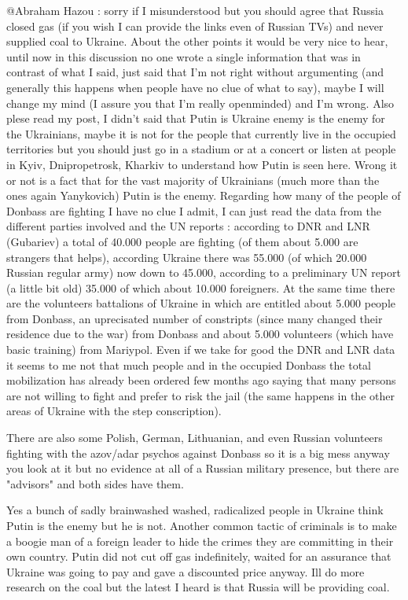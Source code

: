 \begin{itemize}
\begin{itemize}
@Abraham Hazou : sorry if I misunderstood but you should agree that Russia
closed gas (if you wish I can provide the links even of Russian TVs) and never
supplied coal to Ukraine. About the other points it would be very nice to hear,
until now in this discussion no one wrote a single information that was in
contrast of what I said, just said that I'm not right without argumenting (and
generally this happens when people have no clue of what to say), maybe I will
change my mind (I assure you that I'm really openminded) and I'm wrong. Also
plese read my post, I didn't said that Putin is Ukraine enemy is the enemy for
the Ukrainians, maybe it is not for the people that currently live in the
occupied territories but you should just go in a stadium or at a concert or
listen at people in Kyiv, Dnipropetrosk, Kharkiv to understand how Putin is
seen here. Wrong it or not is a fact that for the vast majority of Ukrainians
(much more than the ones again Yanykovich) Putin is the enemy. Regarding how
many of the people of Donbass are fighting I have no clue I admit, I can just
read the data from the different parties involved and the UN reports :
according to DNR and LNR (Gubariev) a total of 40.000 people are fighting (of
them about 5.000 are strangers that helps), according Ukraine there was 55.000
(of which 20.000 Russian regular army) now down to 45.000, according to a
preliminary UN report (a little bit old) 35.000 of which about 10.000
foreigners. At the same time there are the volunteers battalions of Ukraine in
which are entitled about 5.000 people from Donbass, an uprecisated number of
constripts (since many changed their residence due to the war) from Donbass and
about 5.000 volunteers (which have basic training) from Mariypol. Even if we
take for good the DNR and LNR data it seems to me not that much people and in
the occupied Donbass the total mobilization has already been ordered few months
ago saying that many persons are not willing to fight and prefer to risk the
jail (the same happens in the other areas of Ukraine with the step
conscription).


There are also some Polish, German, Lithuanian, and even Russian volunteers
fighting with the azov/adar psychos against Donbass so it is a big mess anyway
you look at it but no evidence at all of a Russian military presence, but there
are "advisors" and both sides have them.

Yes a bunch of sadly brainwashed washed, radicalized people in Ukraine think
Putin is the enemy but he is not. Another common tactic of criminals is to make
a boogie man of a foreign leader to hide the crimes they are committing in
their own country. Putin did not cut off gas indefinitely, waited for an
assurance that Ukraine was going to pay and gave a discounted price anyway. Ill
do more research on the coal but the latest I heard is that Russia will be
providing coal.


\end{itemize}
\end{itemize}
